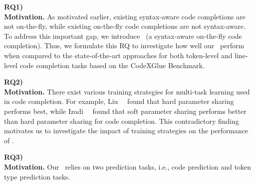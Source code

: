 \begin{description}
    \item \textbf{RQ1) \rqone} \\
    \textbf{Motivation.} 
    As motivated earlier, existing syntax-aware code completions are not on-the-fly, while existing on-the-fly code completions are not syntax-aware.
    To address this important gap, we introduce \our~(a syntax-aware on-the-fly code completion).
    Thus, we formulate this RQ to investigate how well our \our~perform when compared to the state-of-the-art approaches for both token-level and line-level code completion tasks based on the CodeXGlue Benchmark.
    \item \textbf{RQ2) \rqtwo} \\
    \textbf{Motivation.} 
    There exist various training strategies for multi-task learning used in code completion.
    For example, Liu~\ea~\cite{liu2022unified} found that hard parameter sharing performs best, while Izadi~\ea~\cite{izadi2022codefill} found that soft parameter sharing performs better than hard parameter sharing for code completion.
    This contradictory finding motivates us to investigate the impact of training strategies on the performance of \our.
    \item \textbf{RQ3) \rqthree} \\
    \textbf{Motivation.}
    Our \our~relies on two prediction tasks, i.e., code prediction and token type prediction tasks. 

\end{description}
